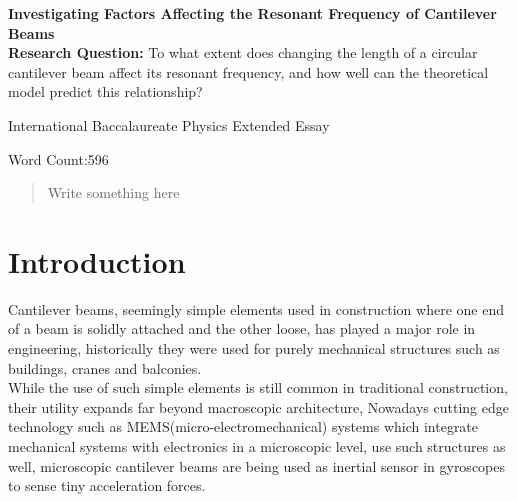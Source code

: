 \documentclass[a4paper,12pt]{article}
\newcommand{\ResearchQ}{To what extent does changing the length of a circular cantilever beam affect its resonant frequency, and how well can the theoretical model predict this relationship?}
\begin{document}
\begin{titlepage}
    \begin{center}
        \vspace*{1cm}

        \textbf{Investigating Factors Affecting the Resonant Frequency of Cantilever Beams}\\

        \vspace{.5cm}
        \textbf{Research Question:}
        \ResearchQ

        \vspace{0.5cm}
        International Baccalaureate Physics Extended Essay

        \vfill

        \vspace{0.8cm}

        Word Count:596


    \end{center}
\end{titlepage}


\tableofcontents
{}
\pagebreak

\begin{abstract}

    Write something here
\end{abstract}
\pagebreak


\section{Introduction}%

Cantilever beams, seemingly simple elements used in construction where one end of a beam is solidly attached and the other loose, has played a major role in engineering, historically they were used for purely mechanical structures such as buildings, cranes and balconies.
\autocite{BuildingConstructionBook}\\
While the use of such simple elements is still common in traditional construction, their utility expands far beyond macroscopic architecture, Nowadays cutting edge technology such as MEMS(micro-electromechanical) systems which integrate mechanical systems with electronics in a microscopic level, use such structures as well, microscopic cantilever beams are being used as inertial sensor in gyroscopes to sense tiny acceleration forces.
\autocite{MemsBook}%
\end{document}
